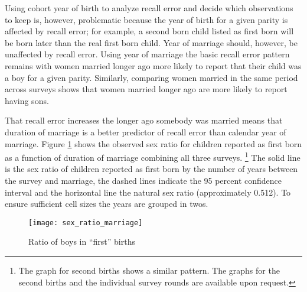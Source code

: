 \documentclass[12pt,letterpaper]{article}
\begin{document}
Using cohort year of birth to analyze recall error and decide which observations
to keep is, however, problematic because the year of birth for a given parity is affected 
by recall error; for example, a second born child listed as first born will be 
born later than the real first born child.
Year of marriage should, however, be unaffected by recall error.
Using year of marriage the basic recall error pattern remains with women married longer 
ago more likely to report that their child was a boy for a given parity.
Similarly, comparing women married in the same period across surveys shows
that women married longer ago are more likely to report having sons.

That recall error increases the longer ago somebody was married means
that duration of marriage is a better predictor of recall error than calendar year of 
marriage.
Figure \ref{fig:sexRatioMarriage} shows the observed sex ratio for children 
reported as first born as a function of duration of marriage combining all three surveys.%
\footnote{
The graph for second births shows a similar pattern.
The graphs for the second births and the individual survey rounds are available upon request.
}
The solid line is the sex ratio of children reported 
as first born by the number of years between the survey and marriage, 
the dashed lines indicate the 95 percent confidence interval 
and the horizontal line the natural sex ratio (approximately 0.512).
To ensure sufficient cell sizes the years are grouped in twos.

\begin{figure}[htp]%
\centering
\texttt{[image: sex\_ratio\_marriage]}
\caption{Ratio of boys in ``first'' births}
\label{fig:sexRatioMarriage}
\end{figure}

\end{document}
